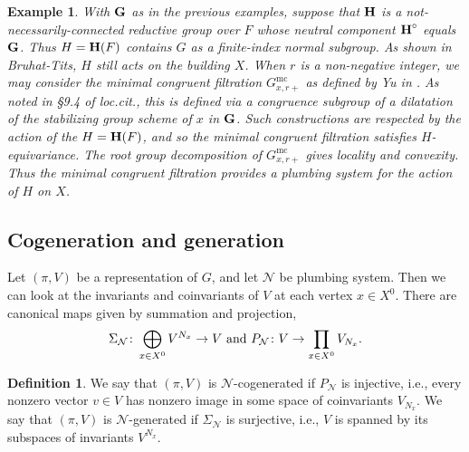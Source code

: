 \documentclass[letter]{amsart}
\newtheorem{example}[thm]{Example}
\theoremstyle{definition}
\newtheorem{definition}[thm]{Definition}
\theoremstyle{remark}
\numberwithin{thm}{section}
\numberwithin{equation}{section}
\renewcommand{\NN}{{\mathcal N}}
\DeclareMathOperator{\minc}{mc}
\begin{document}
\begin{example}
\label{Ex3}
With $\boldsymbol{\mathrm{G}}$ as in the previous examples, suppose that $\boldsymbol{\mathrm{H}}$ is a not-necessarily-connected reductive group over $F$ whose neutral component $\boldsymbol{\mathrm{H}}^\circ$ equals $\boldsymbol{\mathrm{G}}$.  Thus $H = \boldsymbol{\mathrm{H}}(F)$ contains $G$ as a finite-index normal subgroup.  As shown in Bruhat-Tits, $H$ still acts on the building $X$.  When $r$ is a non-negative integer, we may consider the minimal congruent filtration $G_{x,r+}^{\minc}$ as defined by Yu in \cite{YuSmoothModels}.  As noted in \S9.4 of {\em loc.cit.}, this is defined via a congruence subgroup of a dilatation of the stabilizing group scheme of $x$ in $\boldsymbol{\mathrm{G}}$.  Such constructions are respected by the action of the $H = \boldsymbol{\mathrm{H}}(F)$, and so the minimal congruent filtration satisfies $H$-equivariance.  The root group decomposition of $G_{x,r+}^{\minc}$ gives locality and convexity.  Thus the minimal congruent filtration provides a plumbing system for the action of $H$ on $X$.
\end{example}

\subsection{Cogeneration and generation}

Let $(\pi, V)$ be a representation of $G$, and let $\NN$ be plumbing system.  Then we can look at the invariants and coinvariants of $V$ at each vertex $x \in X^0$.  There are canonical maps given by summation and projection,
$$\Sigma_\NN \From \bigoplus_{x \in X^0} V^{N_x} \To V \text{ and } P_\NN \From V \To \prod_{x \in X^0} V_{N_x}.$$
\begin{definition}
We say that $(\pi, V)$ is $\NN$-cogenerated if $P_\NN$ is injective, i.e., every nonzero vector $v \in V$ has nonzero image in some space of coinvariants $V_{N_x}$.  We say that $(\pi, V)$ is $\NN$-generated if $\Sigma_\NN$ is surjective, i.e., $V$ is spanned by its subspaces of invariants $V^{N_x}$.  
\end{definition}
\end{document}
